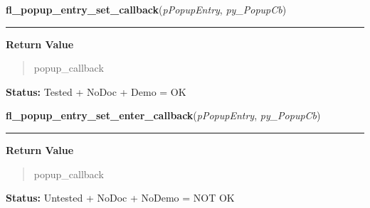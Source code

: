 \hspace{.8\funcindent}\begin{boxedminipage}{\funcwidth}

    \raggedright \textbf{fl\_popup\_entry\_set\_callback}(\textit{pPopupEntry}, \textit{py\_PopupCb})

    \vspace{-1.5ex}

    \rule{\textwidth}{0.5\fboxrule}
\setlength{\parskip}{2ex}
\setlength{\parskip}{1ex}
      \textbf{Return Value}
    \vspace{-1ex}

      \begin{quote}
      popup\_callback

      \end{quote}

\textbf{Status:} Tested + NoDoc + Demo = OK



    \end{boxedminipage}

    \label{xformslib:library:fl_popup_entry_set_enter_callback}

    \vspace{0.5ex}

\hspace{.8\funcindent}\begin{boxedminipage}{\funcwidth}

    \raggedright \textbf{fl\_popup\_entry\_set\_enter\_callback}(\textit{pPopupEntry}, \textit{py\_PopupCb})

    \vspace{-1.5ex}

    \rule{\textwidth}{0.5\fboxrule}
\setlength{\parskip}{2ex}
\setlength{\parskip}{1ex}
      \textbf{Return Value}
    \vspace{-1ex}

      \begin{quote}
      popup\_callback

      \end{quote}

\textbf{Status:} Untested + NoDoc + NoDemo = NOT OK



    \end{boxedminipage}

    \label{xformslib:library:fl_popup_entry_set_leave_callback}

